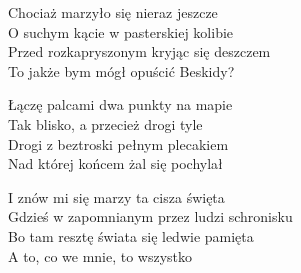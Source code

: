 \begin{text}
Chociaż marzyło się nieraz jeszcze\\
O suchym kącie w pasterskiej kolibie\\
Przed rozkapryszonym kryjąc się deszczem\\
To jakże bym mógł opuścić Beskidy?

Łączę palcami dwa punkty na mapie\\
Tak blisko, a przecież drogi tyle\\
Drogi z beztroski pełnym plecakiem\\
Nad której końcem żal się pochylał

I znów mi się marzy ta cisza święta\\
Gdzieś w zapomnianym przez ludzi schronisku\\
Bo tam resztę świata się ledwie pamięta\\
A to, co we mnie, to wszystko
\end{text}
\begin{chord}
\end{chord}